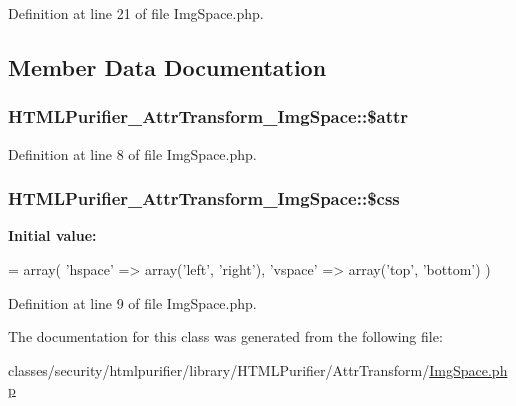 Definition at line 21 of file Img\+Space.\+php.



\subsection{Member Data Documentation}
\hypertarget{classHTMLPurifier__AttrTransform__ImgSpace_a6bbabae9f08859c1bde6afea203650bd}{
\subsubsection[{\$attr}]{\setlength{\rightskip}{0pt plus 5cm}H\+T\+M\+L\+Purifier\+\_\+\+Attr\+Transform\+\_\+\+Img\+Space\+::\$attr\hspace{0.3cm}{\ttfamily [protected]}}}\label{classHTMLPurifier__AttrTransform__ImgSpace_a6bbabae9f08859c1bde6afea203650bd}


Definition at line 8 of file Img\+Space.\+php.

\hypertarget{classHTMLPurifier__AttrTransform__ImgSpace_a20d57cb323becdfd30f98b56fc7dc643}{
\subsubsection[{\$css}]{\setlength{\rightskip}{0pt plus 5cm}H\+T\+M\+L\+Purifier\+\_\+\+Attr\+Transform\+\_\+\+Img\+Space\+::\$css\hspace{0.3cm}{\ttfamily [protected]}}}\label{classHTMLPurifier__AttrTransform__ImgSpace_a20d57cb323becdfd30f98b56fc7dc643}
{\bfseries Initial value\+:}
\begin{DoxyCode}
= array(
        \textcolor{stringliteral}{'hspace'} => array(\textcolor{stringliteral}{'left'}, \textcolor{stringliteral}{'right'}),
        \textcolor{stringliteral}{'vspace'} => array(\textcolor{stringliteral}{'top'}, \textcolor{stringliteral}{'bottom'})
    )
\end{DoxyCode}


Definition at line 9 of file Img\+Space.\+php.



The documentation for this class was generated from the following file\+:\begin{DoxyCompactItemize}
\item 
classes/security/htmlpurifier/library/\+H\+T\+M\+L\+Purifier/\+Attr\+Transform/\hyperlink{ImgSpace_8php}{Img\+Space.\+php}\end{DoxyCompactItemize}
